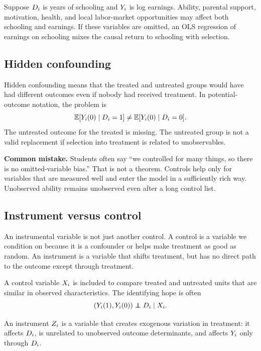\begin{exmp}
Suppose $D_i$ is years of schooling and $Y_i$ is log earnings. Ability,
parental support, motivation, health, and local labor-market opportunities may
affect both schooling and earnings. If these variables are omitted, an OLS
regression of earnings on schooling mixes the causal return to schooling with
selection.
\end{exmp}

\subsection{Hidden confounding}

Hidden confounding means that the treated and untreated groups would have had
different outcomes even if nobody had received treatment. In potential-outcome
notation, the problem is
\[
    \mathbb{E}[Y_i(0) \mid D_i=1] \neq \mathbb{E}[Y_i(0) \mid D_i=0].
\]
The untreated outcome for the treated is missing. The untreated group is not a
valid replacement if selection into treatment is related to unobservables.

\begin{boxF}
\textbf{Common mistake.} Students often say ``we controlled for many things, so
there is no omitted-variable bias.'' That is not a theorem. Controls help only
for variables that are measured well and enter the model in a sufficiently rich
way. Unobserved ability remains unobserved even after a long control list.
\end{boxF}

\subsection{Instrument versus control}

An instrumental variable is not just another control. A control is a variable
we condition on because it is a confounder or helps make treatment as good as
random. An instrument is a variable that shifts treatment, but has no direct
path to the outcome except through treatment.

\begin{defN}[Control]
A control variable $X_i$ is included to compare treated and untreated units that
are similar in observed characteristics. The identifying hope is often
\[
    (\Yone,\Yzero) \independent \Di \mid \Xcov.
\]
\end{defN}

\begin{defN}[Instrument]
An instrument $Z_i$ is a variable that creates exogenous variation in treatment:
it affects $D_i$, is unrelated to unobserved outcome determinants, and affects
$Y_i$ only through $D_i$.
\end{defN}

